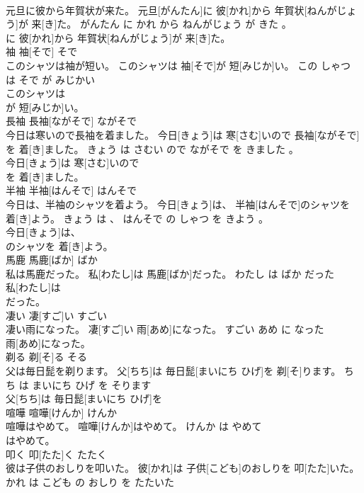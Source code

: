 \documentclass[8pt]{extreport}
\begin{document}
\begin{CJK}{UTF8}{min}
\\	元旦に彼から年賀状が来た。	元旦[がんたん]に 彼[かれ]から 年賀状[ねんがじょう]が 来[き]た。	がんたん に かれ から ねんがじょう が きた 。	
\\	に 彼[かれ]から 年賀状[ねんがじょう]が 来[き]た。			
\\	袖	袖[そで]	そで	
\\	このシャツは袖が短い。	このシャツは 袖[そで]が 短[みじか]い。	この しゃつ は そで が みじかい	
\\	このシャツは
\\	が 短[みじか]い。			
\\	長袖	長袖[ながそで]	ながそで	
\\	今日は寒いので長袖を着ました。	今日[きょう]は 寒[さむ]いので 長袖[ながそで]を 着[き]ました。	きょう は さむい ので ながそで を きました 。	
\\	今日[きょう]は 寒[さむ]いので
\\	を 着[き]ました。			
\\	半袖	半袖[はんそで]	はんそで	
\\	今日は、半袖のシャツを着よう。	今日[きょう]は、 半袖[はんそで]のシャツを 着[き]よう。	きょう は 、 はんそで の しゃつ を きよう 。	
\\	今日[きょう]は、
\\	のシャツを 着[き]よう。			
\\	馬鹿	馬鹿[ばか]	ばか	
\\	私は馬鹿だった。	私[わたし]は 馬鹿[ばか]だった。	わたし は ばか だった	
\\	私[わたし]は
\\	だった。			
\\	凄い	凄[すご]い	すごい	
\\	凄い雨になった。	凄[すご]い 雨[あめ]になった。	すごい あめ に なった	
\\	雨[あめ]になった。			
\\	剃る	剃[そ]る	そる	
\\	父は毎日髭を剃ります。	父[ちち]は 毎日髭[まいにち ひげ]を 剃[そ]ります。	ちち は まいにち ひげ を そります	
\\	父[ちち]は 毎日髭[まいにち ひげ]を
\\	喧嘩	喧嘩[けんか]	けんか	
\\	喧嘩はやめて。	喧嘩[けんか]はやめて。	けんか は やめて	
\\	はやめて。			
\\	叩く	叩[たた]く	たたく	
\\	彼は子供のおしりを叩いた。	彼[かれ]は 子供[こども]のおしりを 叩[たた]いた。	かれ は こども の おしり を たたいた	

\end{CJK}
\end{document}
